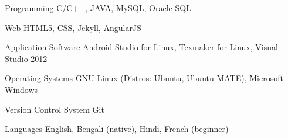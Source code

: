


\begin{cvskills}


\cvskill
{Programming} %
{C/C++, JAVA, MySQL, Oracle SQL} %


\cvskill
{Web} %
{ HTML5, CSS, Jekyll, AngularJS} %


\cvskill
{Application Software} %
{Android Studio for Linux, Texmaker for Linux, Visual Studio 2012} %


\cvskill
{Operating Systems} %
{GNU Linux (Distros: Ubuntu, Ubuntu MATE), Microsoft Windows} %


\cvskill
{Version Control System} %
{Git} %


\cvskill
{Languages} %
{English, Bengali (native), Hindi, French (beginner)} %


\end{cvskills}